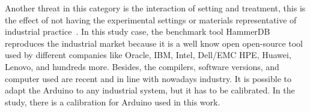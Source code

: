 Another threat in this category is the interaction of setting and treatment, this is the effect of not having the experimental settings or materials representative of industrial practice~\cite{10.5555/2349018}.  In this study case, the benchmark tool HammerDB reproduces the industrial market because it is a well know open open-source tool used by different companies like Oracle, IBM, Intel, Dell/EMC HPE, Huawei, Lenovo, and hundreds more. Besides, the compilers, software versions, and computer used are recent and in line with nowadays industry. It is possible to adapt the Arduino to any industrial system, but it has to be calibrated. In the \citeauthor{portela2016} study, there is a calibration for Arduino used in this work. 







